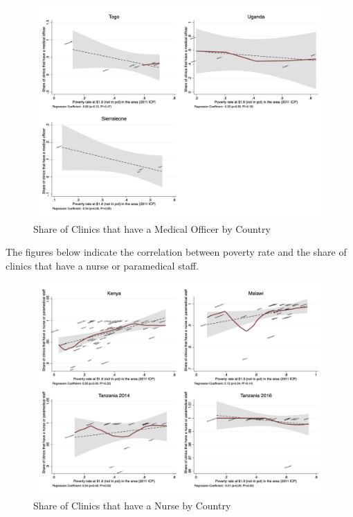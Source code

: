 \documentclass{article}                 %
\begin{document}
			\begin{figure}[H] 
				\centering
				\caption{Share of Clinics that have a Medical Officer by Country} 
				\includegraphics[width=\textwidth]{"../Output/Final/poverty_fl_3_medone"}
			\end{figure}
		
	The figures below indicate the correlation between poverty rate and the share of clinics that have a nurse or paramedical staff.
	
			\begin{figure}[H] 
				\centering
				\caption{Share of Clinics that have a Nurse by Country} 
				\includegraphics[width=\textwidth]{"../Output/Final/poverty_fl_1_mednurs"}
			\end{figure}
			
\end{document}
